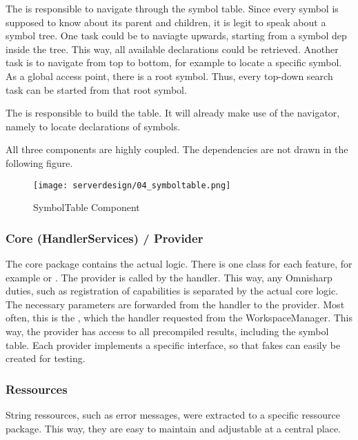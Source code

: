 The  is responsible to navigate through the symbol table. Since every symbol is supposed to know about its parent and children, it is legit to speak about a symbol tree. One task could be to naviagte upwards, starting from a symbol dep inside the tree. This way, all available declarations could be retrieved. Another task is to navigate from top to bottom, for example to locate a specific symbol. As a global access point, there is a root symbol. Thus, every top-down search task can be started from that root symbol.

The  is responsible to build the table. It will already make use of the navigator, namely to locate declarations of symbols.

All three components are highly coupled. The dependencies are not drawn in the following figure.


\begin{figure}[H]
    \centering
    \texttt{[image: serverdesign/04\_symboltable.png]}
    \caption{SymbolTable Component}
    \label{fig:server_st}
\end{figure}




\subsubsection {Core (HandlerServices) / Provider}
The core package contains the actual logic. There is one class for each feature, for example  or . The provider is called by the handler. This way, any Omnisharp duties, such as registration of capabilities is separated by the actual core logic. The necessary parameters are forwarded from the handler to the provider. Most often, this is the , which the handler requested from the WorkspaceManager. This way, the provider has access to all precompiled results, including the symbol table. Each provider implements a specific interface, so that fakes can easily be created for testing.


\subsubsection{Ressources}
String ressources, such as error messages, were extracted to a specific ressource package. This way, they are easy to maintain and adjustable at a central place.

